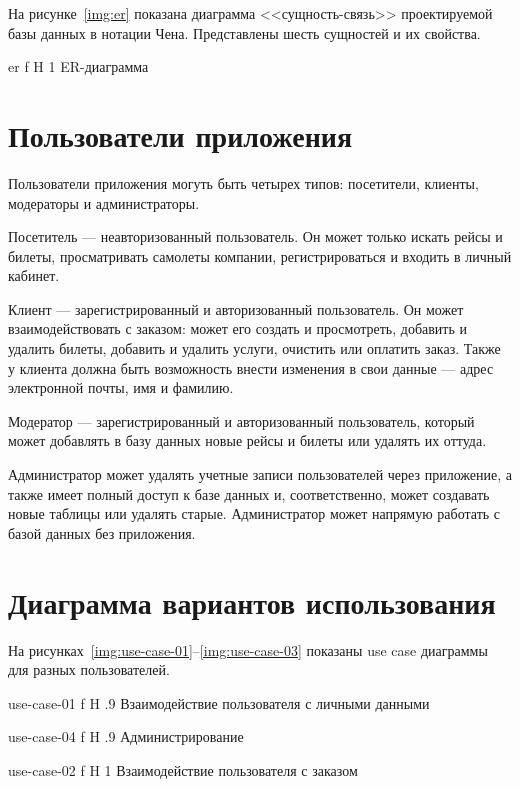 \documentclass{bmstu}
\begin{document}
На рисунке~\ref{img:er} показана диаграмма <<сущность-связь>> проектируемой базы данных в нотации Чена. 
Представлены шесть сущностей и их свойства.

    {er}
    {f}
    {H}
    {1\textwidth}
    {ER-диаграмма}
    
\section{Пользователи приложения}

Пользователи приложения могуть быть четырех типов: посетители, клиенты, модераторы и администраторы.

Посетитель --- неавторизованный пользователь. 
Он может только искать рейсы и билеты, просматривать самолеты компании, регистрироваться и входить в личный кабинет.

Клиент --- зарегистрированный и авторизованный пользователь. 
Он может взаимодействовать с заказом: может его создать и просмотреть, добавить и удалить билеты, добавить и удалить услуги, очистить или оплатить заказ. 
Также у клиента должна быть возможность внести изменения в свои данные --- адрес электронной почты, имя и фамилию. 

Модератор --- зарегистрированный и авторизованный пользователь, который может добавлять в базу данных новые рейсы и билеты или удалять их оттуда.

Администратор может удалять учетные записи пользователей через приложение, а также имеет полный доступ к базе данных и, соответственно, может создавать новые таблицы или удалять старые. 
Администратор может напрямую работать с базой данных без приложения.

\pagebreak
\section{Диаграмма вариантов использования}

На рисунках~\ref{img:use-case-01}--\ref{img:use-case-03} показаны use case диаграммы для разных пользователей.

    {use-case-01}
    {f}
    {H}
    {.9\textwidth}
    {Взаимодействие пользователя с личными данными}
    
    {use-case-04}
    {f}
    {H}
    {.9\textwidth}
    {Администрирование}
    
    {use-case-02}
    {f}
    {H}
    {1\textwidth}
    {Взаимодействие пользователя с заказом}
    
\end{document}
